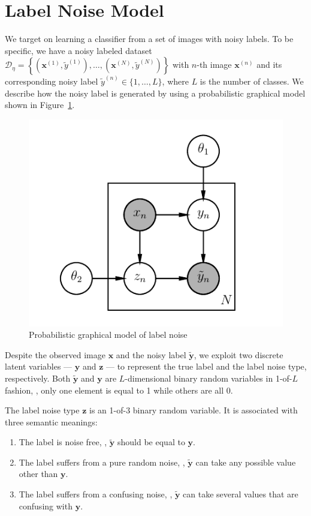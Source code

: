 \documentclass[10pt,twocolumn,letterpaper]{article}
\def\vec{\mathbf}
\begin{document}
\section{Label Noise Model} %
\label{sec:label_noise_model}
We target on learning a classifier from a set of images with noisy labels. To be specific, we have a noisy labeled dataset $\mathcal{D}_{\eta}=\left\{\left(\vec{x}^{(1)}, \tilde{y}^{(1)}\right), \dots, \left(\vec{x}^{(N)}, \tilde{y}^{(N)}\right)\right\}$ with $n$-th image $\vec{x}^{(n)}$ and its corresponding noisy label $\tilde{y}^{(n)} \in \{1,\dots,L\}$, where $L$ is the number of classes. We describe how the noisy label is generated by using a probabilistic graphical model shown in Figure~\ref{fig:noise_pgm}.

\begin{figure}[h!]
\begin{center}
\includegraphics[width=0.5\linewidth]{figure/pgm.pdf}
\end{center}
\caption{Probabilistic graphical model of label noise}
\label{fig:noise_pgm}
\end{figure}

Despite the observed image $\vec{x}$ and the noisy label $\tilde{\vec{y}}$, we exploit two discrete latent variables --- $\vec{y}$ and $\vec{z}$ --- to represent the true label and the label noise type, respectively. Both $\tilde{\vec{y}}$ and $\vec{y}$ are $L$-dimensional binary random variables in 1-of-$L$ fashion, \ie, only one element is equal to 1 while others are all 0.

The label noise type $\vec{z}$ is an 1-of-3 binary random variable. It is associated with three semantic meanings:
\begin{enumerate}
    \item The label is noise free, \ie, $\tilde{\vec{y}}$ should be equal to $\vec{y}$.
    \item The label suffers from a pure random noise, \ie, $\tilde{\vec{y}}$ can take any possible value other than $\vec{y}$.
    \item The label suffers from a confusing noise, \ie, $\tilde{\vec{y}}$ can take several values that are confusing with $\vec{y}$.
\end{enumerate}
\end{document}
